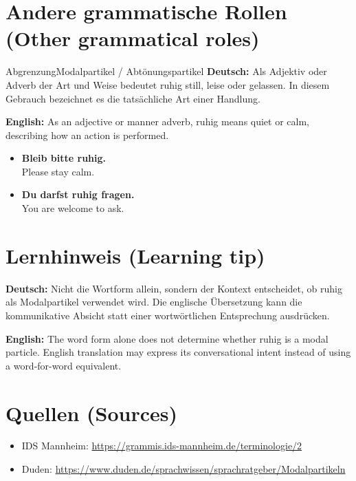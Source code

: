 \documentclass[a4paper,11pt]{article}
\newcommand{\GermanText}[1]{\textbf{Deutsch: }#1\par}
\newcommand{\EnglishText}[1]{{\small\color{SoftGray}\textbf{English: }#1\par}}
\newcommand{\ExampleItem}[2]{\item \textbf{#1}\\{\small\color{SoftGray}#2}}
\begin{document}
\section{Andere grammatische Rollen \textnormal{(Other grammatical roles)}}
\begin{grammarentry}{Abgrenzung}{Modalpartikel / Abtönungspartikel}
\GermanText{Als Adjektiv oder Adverb der Art und Weise bedeutet ruhig still, leise oder gelassen. In diesem Gebrauch bezeichnet es die tatsächliche Art einer Handlung.}
\EnglishText{As an adjective or manner adverb, ruhig means quiet or calm, describing how an action is performed.}
\end{grammarentry}
\begin{exbox}\begin{itemize}
\ExampleItem{Bleib bitte ruhig.}{Please stay calm.}
\ExampleItem{Du darfst ruhig fragen.}{You are welcome to ask.}
\end{itemize}\end{exbox}
\section{Lernhinweis \textnormal{(Learning tip)}}
\GermanText{Nicht die Wortform allein, sondern der Kontext entscheidet, ob ruhig als Modalpartikel verwendet wird. Die englische Übersetzung kann die kommunikative Absicht statt einer wortwörtlichen Entsprechung ausdrücken.}
\EnglishText{The word form alone does not determine whether ruhig is a modal particle. English translation may express its conversational intent instead of using a word-for-word equivalent.}
\section{Quellen \textnormal{(Sources)}}
\begin{itemize}
\item IDS Mannheim: \url{https://grammis.ids-mannheim.de/terminologie/2}
\item Duden: \url{https://www.duden.de/sprachwissen/sprachratgeber/Modalpartikeln}
\end{itemize}
\end{document}
